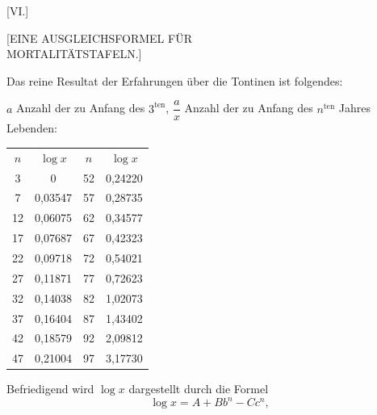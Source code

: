 \clearpage
{}
\begin{center}
[VI.]

{\large [EINE AUSGLEICHSFORMEL FÜR\\ MORTALITÄTSTAFELN.]}
\end{center}



Das reine Resultat der Erfahrungen über die Tontinen ist folgendes:

$a$ Anzahl der zu Anfang des $3^{\text{ten}}$, $\dfrac{a}{x}$ Anzahl der zu Anfang des
$n^{\text{ten}}$ Jahres Lebenden:

\begin{center}
\begin{tabular}{cc|cc}
$n$ & $\log x$ & $n$ & $\log x$ \\
3 & 0 & 52 & 0,24220 \\
7 & 0,03547 & 57 & 0,28735 \\
12 & 0,06075 & 62 & 0,34577 \\
17 & 0,07687 & 67 & 0,42323 \\
22 & 0,09718 & 72 & 0,54021 \\
27 & 0,11871 & 77 & 0,72623 \\
32 & 0,14038 & 82 & 1,02073 \\
37 & 0,16404 & 87 & 1,43402 \\
42 & 0,18579 & 92 & 2,09812 \\
47 & 0,21004 & 97 & 3,17730 \\
\end{tabular}
\end{center}

Befriedigend wird $\log x$ dargestellt durch die Formel
\[
\log x = A+Bb^n-Cc^n,
\]
